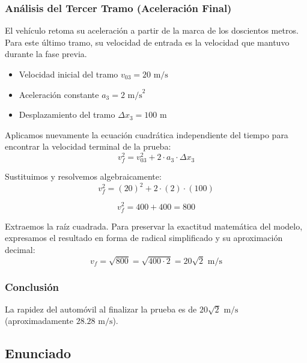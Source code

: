 \documentclass[12pt, a4paper]{article}
\begin{document}
\subsubsection*{Análisis del Tercer Tramo (Aceleración Final)}

El vehículo retoma su aceleración a partir de la marca de los doscientos metros. Para este último tramo, su velocidad de entrada es la velocidad que mantuvo durante la fase previa.
\begin{itemize}
    \item Velocidad inicial del tramo $v_{03} = 20 \text{ m/s}$
    \item Aceleración constante $a_3 = 2 \text{ m/s}^2$
    \item Desplazamiento del tramo $\Delta x_3 = 100 \text{ m}$
\end{itemize}

Aplicamos nuevamente la ecuación cuadrática independiente del tiempo para encontrar la velocidad terminal de la prueba:
\begin{equation}
v_f^2 = v_{03}^2 + 2 \cdot a_3 \cdot \Delta x_3
\end{equation}

Sustituimos y resolvemos algebraicamente:
\begin{equation}
v_f^2 = (20)^2 + 2 \cdot (2) \cdot (100)
\end{equation}

\begin{equation}
v_f^2 = 400 + 400 = 800
\end{equation}

Extraemos la raíz cuadrada. Para preservar la exactitud matemática del modelo, expresamos el resultado en forma de radical simplificado y su aproximación decimal:
\begin{equation}
v_f = \sqrt{800} = \sqrt{400 \cdot 2} = 20\sqrt{2} \text{ m/s}
\end{equation}

\subsubsection*{Conclusión}

La rapidez del automóvil al finalizar la prueba es de $20\sqrt{2} \text{ m/s}$ (aproximadamente $28.28 \text{ m/s}$).

\newpage

\subsection*{Enunciado}
\end{document}
